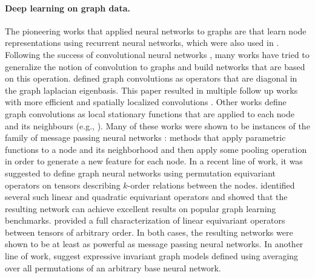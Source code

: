 \documentclass{article}
\newcommand{\eg}{{e.g.}}
\begin{document}
\paragraph{Deep learning on graph data.}
The pioneering works that applied neural networks to graphs are \cite{Gori2005,Scarselli2009} that learn node representations using recurrent neural networks, which were also used in \cite{Li2015}. Following the success of convolutional neural networks \citep{krizhevsky2012imagenet}, many works have tried to generalize the notion of convolution to graphs and build networks that are based on this operation. \cite{Bruna2013} defined graph convolutions as operators that are diagonal in the graph laplacian eigenbasis. This paper resulted in multiple follow up works with more efficient and spatially localized convolutions \citep{Henaff2015,Defferrard2016,kipf,Levie2017}. Other works define graph convolutions as local stationary functions that are applied to each node and its neighbours (\eg, \cite{Duvenaud2015,Atwood2015,Niepert2016,hamilton2017representation,Velickovic2017,Monti2018}). Many of these works were shown to be instances of the family of message passing neural networks \citep{Gilmer2017}: methods that apply parametric functions to a node and its neighborhood and then apply some pooling operation in order to generate a new feature for each node. 
 In a recent line of work, it was suggested to define graph neural networks using permutation equivariant operators on tensors describing $k$-order relations between the nodes. \cite{Kondor2018} identified several such linear and quadratic equivariant operators and showed that the resulting network can achieve excellent results on popular graph learning benchmarks. \cite{maron2018invariant} provided a full characterization of linear equivariant operators between tensors of arbitrary order. In both cases, the resulting networks were shown to be at least as powerful as message passing neural networks. In another line of work, \cite{murphy2019relational} suggest expressive invariant graph models defined using averaging over all permutations of an arbitrary base neural network.    
\end{document}
